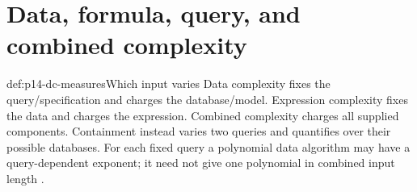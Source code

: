 \section{Data, formula, query, and combined complexity}
\label{sec:p14-dc-measures}

\begin{hbdefinition}{def:p14-dc-measures}{Which input varies}
Data complexity fixes the query/specification and charges the database/model.
Expression complexity fixes the data and charges the expression. Combined
complexity charges all supplied components. Containment instead varies two
queries and quantifies over their possible databases. For each fixed query a
polynomial data algorithm may have a query-dependent exponent; it need not
give one polynomial in combined input length
\cite{Vardi1982,AbiteboulHullVianu1995}.
\end{hbdefinition}

